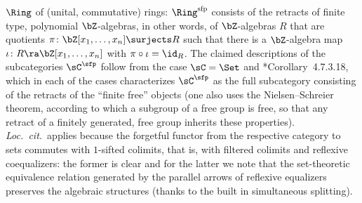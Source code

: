 \m
$\Ring$ of (unital, commutative) rings: $\Ring^{\mathrm{sfp}}$ consists of the retracts of finite type, polynomial $\bZ$-algebras, in other words, of $\bZ$-algebras $R$ that are quotients $\pi \colon \bZ[x_1, \dotsc, x_n] \surjects R$ such that there is a $\bZ$-algebra map $\iota \colon R \ra \bZ[x_1, \dotsc, x_n]$ with	 $\pi \circ \iota = \id_R$.
\eenum
The claimed descriptions of the subcategories $\sC^\sfp$ follow from the case $\sC = \Set$ and \cite{HA}*{Corollary~4.7.3.18}, which in each of the cases characterizes $\sC^\sfp$ as the full subcategory consisting of the retracts of the ``finite free'' objects (one also uses the Nielsen--Schreier theorem, according to which a subgroup of a free group is free, so that any retract of a finitely generated, free group inherits these properties). \emph{Loc.~cit.}~applies because the forgetful functor from the respective category to sets commutes with $1$-sifted colimits, that is, with filtered colimits and reflexive coequalizers: the former is clear and for the latter we note that the set-theoretic equivalence relation generated by the parallel arrows of reflexive equalizers preserves the algebraic structures (thanks to the built in simultaneous splitting).
\eeg






